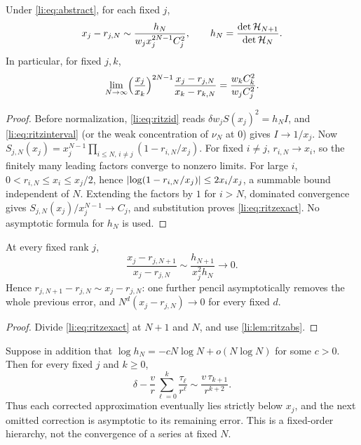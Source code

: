 \begin{theorem}\label{li:thm:ritzexact}
Under \eqref{li:eq:abstract}, for each fixed $j$,
\begin{equation}\label{li:eq:ritzexact}
 x_j-r_{j,N}\sim\frac{h_N}{w_jx_j^{2N-1}C_j^2},\qquad h_N=\frac{\det\mathcal{H}_{N+1}}{\det\mathcal{H}_N}.
\end{equation}
In particular, for fixed $j,k$,
\[
 \lim_{N\to\infty}\Bigl(\frac{x_j}{x_k}\Bigr)^{2N-1}\frac{x_j-r_{j,N}}{x_k-r_{k,N}}
 =\frac{w_kC_k^2}{w_jC_j^2}.
\]
\end{theorem}

\begin{proof}
Before normalization, \eqref{li:eq:ritzid} reads $\delta w_jS(x_j)^2=h_NI$, and
\eqref{li:eq:ritzinterval} (or the weak concentration of $\nu_N$ at $0$) gives $I\to1/x_j$. Now
$S_{j,N}(x_j)=x_j^{N-1}\prod_{i\le N,\,i\ne j}(1-r_{i,N}/x_j)$. For fixed $i\ne j$, $r_{i,N}\to x_i$, so
the finitely many leading factors converge to nonzero limits. For large $i$,
$0<r_{i,N}\le x_i\le x_j/2$, hence $\lvert\log(1-r_{i,N}/x_j)\rvert\le2x_i/x_j$, a summable bound independent of
$N$. Extending the factors by $1$ for $i>N$, dominated convergence gives $S_{j,N}(x_j)/x_j^{N-1}\to C_j$,
and substitution proves \eqref{li:eq:ritzexact}. No asymptotic formula for $h_N$ is used.
\end{proof}

\begin{corollary}\label{li:cor:ritzstep}
At every fixed rank $j$,
\[
 \frac{x_j-r_{j,N+1}}{x_j-r_{j,N}}\sim\frac{h_{N+1}}{x_j^2h_N}\to0 .
\]
Hence $r_{j,N+1}-r_{j,N}\sim x_j-r_{j,N}$: one further pencil asymptotically removes the whole previous
error, and $N^d(x_j-r_{j,N})\to0$ for every fixed $d$.
\end{corollary}

\begin{proof}
Divide \eqref{li:eq:ritzexact} at $N+1$ and $N$, and use \cref{li:lem:ritzabs}.
\end{proof}

\begin{theorem}\label{li:thm:ritznext}
Suppose in addition that $\log h_N=-cN\log N+o(N\log N)$ for some $c>0$. Then for every fixed $j$ and
$k\ge0$,
\[
 \delta-\frac vr\sum_{\ell=0}^k\frac{\tau_\ell}{r^\ell}\sim\frac{v\,\tau_{k+1}}{r^{k+2}} .
\]
Thus each corrected approximation eventually lies strictly below $x_j$, and the next omitted
correction is asymptotic to its remaining error. This is a fixed-order hierarchy, not the convergence
of a series at fixed $N$.
\end{theorem}

